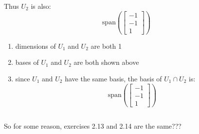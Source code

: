 \documentclass[12pt]{article}
\begin{document}
            Thus $U_2$ is also:
            \begin{equation*}
                \text{span} \left(\left[\begin{matrix}
                    -1\\
                    -1\\
                    1
                \end{matrix}\right] \right)
            \end{equation*}
            \begin{enumerate}[label=(\alph*)]
                \item dimensions of $U_1$ and $U_2$ are both 1
                \item bases of $U_1$ and $U_2$ are both shown above
                \item since $U_1$ and $U_2$ have the same basis, the basis of $U_1 \cap U_2$ is:
                    \begin{equation*}
                        \text{span} \left(\left[\begin{matrix}
                            -1\\
                            -1\\
                            1
                        \end{matrix}\right] \right)
                    \end{equation*}
            \end{enumerate}
        \subsection{}
            So for some reason, exercises 2.13 and 2.14 are the same???
\end{document}
